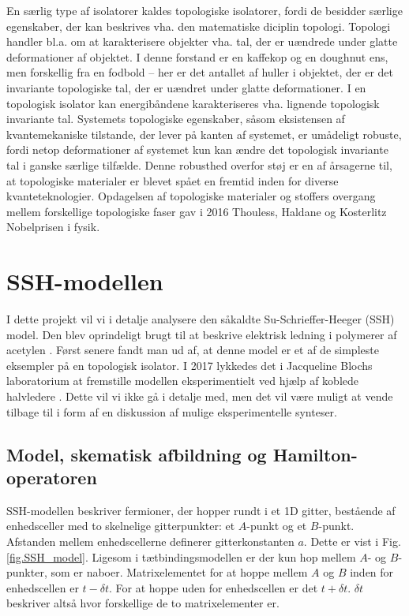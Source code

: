 \documentclass[11pt, a4paper]{article}
\begin{document}
En særlig type af isolatorer kaldes topologiske isolatorer, fordi de 
besidder særlige egenskaber, der kan beskrives vha. den matematiske
diciplin topologi. Topologi handler bl.a. om at karakterisere objekter
vha. tal, der er uændrede under glatte deformationer af objektet. I
denne forstand er en kaffekop og en doughnut ens, men forskellig fra
en fodbold -- her er det antallet af huller i objektet, der er det
invariante topologiske tal, der er uændret under glatte
deformationer. I en topologisk isolator kan energibåndene
karakteriseres vha. lignende topologisk invariante tal. Systemets
topologiske egenskaber, såsom eksistensen af kvantemekaniske
tilstande, der lever på kanten af systemet, er umådeligt robuste,
fordi netop deformationer af systemet kun kan ændre det topologisk
invariante tal i ganske særlige tilfælde. Denne robusthed overfor støj
er en af årsagerne til, at topologiske materialer er blevet spået en
fremtid inden for diverse kvanteteknologier. Opdagelsen af topologiske
materialer og stoffers overgang mellem forskellige topologiske faser
gav i 2016 Thouless, Haldane og Kosterlitz Nobelprisen i fysik.


\section{SSH-modellen}

I dette projekt vil vi i detalje analysere den såkaldte Su-Schrieffer-Heeger (SSH) model. Den blev oprindeligt brugt til at beskrive elektrisk ledning i polymerer af acetylen \cite{ssh}. Først senere fandt man ud af, at denne model er et af de simpleste eksempler på en topologisk isolator. I 2017 lykkedes det i Jacqueline Blochs laboratorium at fremstille modellen eksperimentielt ved hjælp af koblede halvledere \cite{bloch}. Dette vil vi ikke gå i detalje med, men det vil være muligt at vende tilbage til i form af en diskussion af mulige eksperimentelle synteser. 

\subsection{Model, skematisk afbildning og Hamilton-operatoren}

SSH-modellen beskriver fermioner, der hopper rundt i et 1D gitter, bestående af enhedsceller med to skelnelige gitterpunkter: et $A$-punkt og et $B$-punkt. Afstanden mellem enhedscellerne definerer gitterkonstanten $a$. Dette er vist i Fig. \ref{fig.SSH_model}. Ligesom i tætbindingsmodellen er der kun hop mellem $A$- og $B$-punkter, som er naboer. Matrixelementet for at hoppe mellem $A$ og $B$ inden for enhedscellen er $t - \delta t$. For at hoppe uden for enhedscellen er det $t + \delta t$. $\delta t$ beskriver altså hvor forskellige de to matrixelementer er. \\
\end{document}
